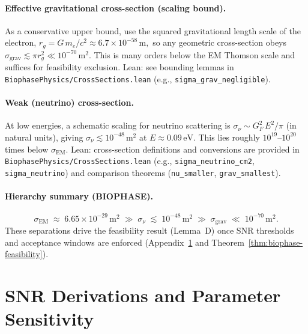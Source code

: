 \documentclass[12pt,a4paper]{article}
\begin{document}
\paragraph{Effective gravitational cross-section (scaling bound).}
As a conservative upper bound, use the squared gravitational length scale of the electron,
\(
  r_{g}=G\,m_{e}/c^{2}\approx 6.7\times 10^{-58}\,\mathrm{m},
\)
so any geometric cross-section obeys
\(
  \sigma_{\mathrm{grav}}\lesssim \pi r_{g}^{2}\ll 10^{-70}\,\mathrm{m}^{2}.
\)
This is many orders below the EM Thomson scale and suffices for feasibility exclusion. Lean: see bounding lemmas in
\texttt{BiophasePhysics/CrossSections.lean} (e.g., \texttt{sigma\_grav\_negligible}).

\paragraph{Weak (neutrino) cross-section.}
At low energies, a schematic scaling for neutrino scattering is
\(
  \sigma_{\nu}\sim G_{F}^{2}\,E^{2}/\pi
\)
(in natural units), giving
\(
  \sigma_{\nu}\lesssim 10^{-48}\,\mathrm{m}^{2}
\)
at \(E\approx 0.09\,\mathrm{eV}\). This lies roughly \(10^{19}\)–\(10^{20}\) times below \(\sigma_{\mathrm{EM}}\). Lean: cross-section definitions and conversions are provided in
\texttt{BiophasePhysics/CrossSections.lean} (e.g., \texttt{sigma\_neutrino\_cm2}, \texttt{sigma\_neutrino}) and comparison theorems (\texttt{nu\_smaller}, \texttt{grav\_smallest}).

\paragraph{Hierarchy summary (BIOPHASE).}
\[
  \sigma_{\mathrm{EM}}\;\approx\;6.65\times 10^{-29}\,\mathrm{m}^{2}
  \;\gg\;
  \sigma_{\nu}\;\lesssim\;10^{-48}\,\mathrm{m}^{2}
  \;\gg\;
  \sigma_{\mathrm{grav}}\;\ll\;10^{-70}\,\mathrm{m}^{2}.
\]
These separations drive the feasibility result (Lemma~D) once SNR thresholds and acceptance windows are enforced (Appendix~\ref{app:snr-derivations} and Theorem~\ref{thm:biophase-feasibility}).


\section{SNR Derivations and Parameter Sensitivity}
\label{app:snr-derivations}
\end{document}

